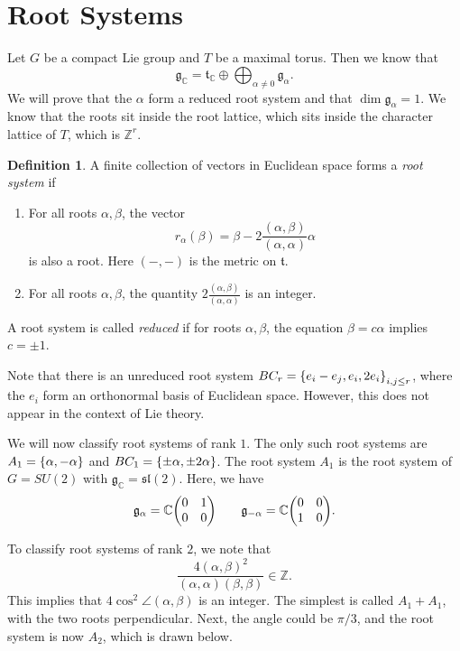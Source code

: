 \documentclass[leqno, openany]{memoir}
\theoremstyle{definition}
\newtheorem{defn}[thm]{Definition}
\theoremstyle{remark}
\theoremstyle{plain}
\theoremstyle{definition}
\theoremstyle{remark}
\newcommand{\C}{\mathbb{C}}
\newcommand{\Z}{\mathbb{Z}}
\newcommand{\mf}[1]{\mathfrak{#1}}
\begin{document}
\section{Root Systems}%
\label{sec:root_systems}

Let $G$ be a compact Lie group and $T$ be a maximal torus. Then we know that
\[ \mf{g}_{\C} = \mf{t}_{\C} \oplus \bigoplus_{\alpha \neq 0} \mf{g}_{\alpha}. \]
We will prove that the $\alpha$ form a reduced root system and that $\dim \mf{g}_{\alpha} = 1$. We know that the roots sit inside the root lattice, which sits inside the character lattice of $T$, which is $\Z^r$.

\begin{defn}
    A finite collection of vectors in Euclidean space forms a \textit{root system} if
    \begin{enumerate}
        \item For all roots $\alpha, \beta$, the vector 
            \[ r_{\alpha}(\beta) = \beta - 2 \frac{(\alpha, \beta)}{(\alpha, \alpha)} \alpha \]
            is also a root. Here $(-,-)$ is the metric on $\mf{t}$.
        \item For all roots $\alpha, \beta$, the quantity $2 \frac{(\alpha, \beta)}{(\alpha, \alpha)}$ is an integer.
    \end{enumerate}
    A root system is called \textit{reduced} if for roots $\alpha, \beta$, the equation $\beta = c \alpha$ implies $c = \pm 1$.
\end{defn}

Note that there is an unreduced root system $BC_r = \qty{e_i - e_j, e_i, 2e_i}_{i,j \leq r}$, where the $e_i$ form an orthonormal basis of Euclidean space. However, this does not appear in the context of Lie theory.

We will now classify root systems of rank $1$. The only such root systems are $A_1 = \qty{\alpha, -\alpha}$ and $BC_1 = \qty{\pm \alpha, \pm 2\alpha}$. The root system $A_1$ is the root system of $G = SU(2)$ with $\mf{g}_{\C} = \mf{sl}(2)$. Here, we have
\[ \mf{g}_{\alpha} = \C \mqty(0 & 1 \\ 0 & 0) \qquad \mf{g}_{-\alpha} = \C \mqty(0 & 0 \\ 1 & 0). \]

To classify root systems of rank $2$, we note that
\[ \frac{4 {(\alpha, \beta)}^2}{(\alpha, \alpha)(\beta, \beta)} \in \Z. \]
This implies that $4 \cos^2 \angle(\alpha, \beta)$ is an integer. The simplest is called $A_1 + A_1$, with the two roots perpendicular. Next, the angle could be $\pi/3$, and the root system is now $A_2$, which is drawn below.
\end{document}
